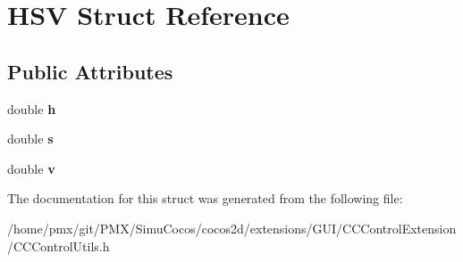 \hypertarget{structHSV}{}\section{H\+SV Struct Reference}
\label{structHSV}
\subsection*{Public Attributes}
\begin{DoxyCompactItemize}
\item 
\mbox{\label{structHSV_ada777d19bc61b99f4724c8f812432a4b}} 
double {\bfseries h}
\item 
\mbox{\label{structHSV_a4e5c5ec8931afcd9dde4dc3a91bd2495}} 
double {\bfseries s}
\item 
\mbox{\label{structHSV_ab71dd1ebe22508398b5ab3c049b85592}} 
double {\bfseries v}
\end{DoxyCompactItemize}


The documentation for this struct was generated from the following file\+:\begin{DoxyCompactItemize}
\item 
/home/pmx/git/\+P\+M\+X/\+Simu\+Cocos/cocos2d/extensions/\+G\+U\+I/\+C\+C\+Control\+Extension/C\+C\+Control\+Utils.\+h\end{DoxyCompactItemize}
